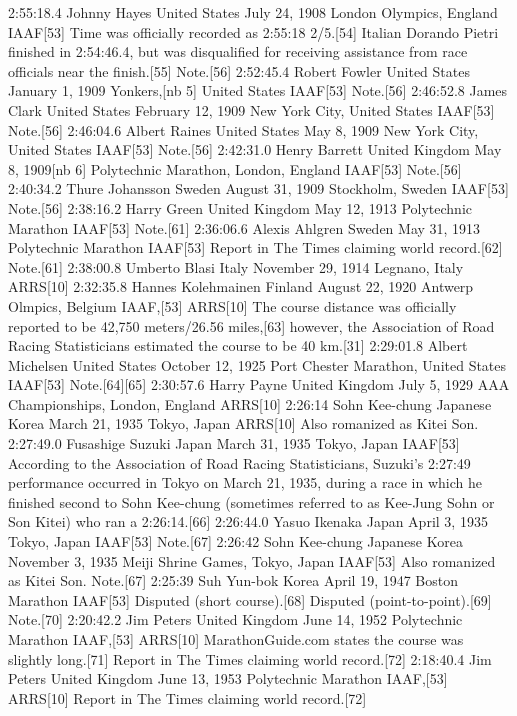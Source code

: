 2:55:18.4	Johnny Hayes	 United States	July 24, 1908	London Olympics, England	IAAF[53]	Time was officially recorded as 2:55:18 2/5.[54] Italian Dorando Pietri finished in 2:54:46.4, but was disqualified for receiving assistance from race officials near the finish.[55] Note.[56]
2:52:45.4	Robert Fowler	 United States	January 1, 1909	Yonkers,[nb 5] United States	IAAF[53]	Note.[56]
2:46:52.8	James Clark	 United States	February 12, 1909	New York City, United States	IAAF[53]	Note.[56]
2:46:04.6	Albert Raines	 United States	May 8, 1909	New York City, United States	IAAF[53]	Note.[56]
2:42:31.0	Henry Barrett	 United Kingdom	May 8, 1909[nb 6]	Polytechnic Marathon, London, England	IAAF[53]	Note.[56]
2:40:34.2	Thure Johansson	 Sweden	August 31, 1909	Stockholm, Sweden	IAAF[53]	Note.[56]
2:38:16.2	Harry Green	 United Kingdom	May 12, 1913	Polytechnic Marathon	IAAF[53]	Note.[61]
2:36:06.6	Alexis Ahlgren	 Sweden	May 31, 1913	Polytechnic Marathon	IAAF[53]	Report in The Times claiming world record.[62] Note.[61]
2:38:00.8	Umberto Blasi	 Italy	November 29, 1914	Legnano, Italy	ARRS[10]	
2:32:35.8	Hannes Kolehmainen	 Finland	August 22, 1920	Antwerp Olmpics, Belgium	IAAF,[53] ARRS[10]	The course distance was officially reported to be 42,750 meters/26.56 miles,[63] however, the Association of Road Racing Statisticians estimated the course to be 40 km.[31]
2:29:01.8	Albert Michelsen	 United States	October 12, 1925	Port Chester Marathon, United States	IAAF[53]	Note.[64][65]
2:30:57.6	Harry Payne	 United Kingdom	July 5, 1929	AAA Championships, London, England	ARRS[10]	
2:26:14	Sohn Kee-chung	Japanese Korea	March 21, 1935	Tokyo, Japan	ARRS[10]	Also romanized as Kitei Son.
2:27:49.0	Fusashige Suzuki	 Japan	March 31, 1935	Tokyo, Japan	IAAF[53]	According to the Association of Road Racing Statisticians, Suzuki's 2:27:49 performance occurred in Tokyo on March 21, 1935, during a race in which he finished second to Sohn Kee-chung (sometimes referred to as Kee-Jung Sohn or Son Kitei) who ran a 2:26:14.[66]
2:26:44.0	Yasuo Ikenaka	 Japan	April 3, 1935	Tokyo, Japan	IAAF[53]	Note.[67]
2:26:42	Sohn Kee-chung	Japanese Korea	November 3, 1935	Meiji Shrine Games, Tokyo, Japan	IAAF[53]	Also romanized as Kitei Son. Note.[67]
2:25:39	Suh Yun-bok	 Korea	April 19, 1947	Boston Marathon	IAAF[53]	Disputed (short course).[68] Disputed (point-to-point).[69] Note.[70]
2:20:42.2	Jim Peters	 United Kingdom	June 14, 1952	Polytechnic Marathon	IAAF,[53] ARRS[10]	MarathonGuide.com states the course was slightly long.[71] Report in The Times claiming world record.[72]
2:18:40.4	Jim Peters	 United Kingdom	June 13, 1953	Polytechnic Marathon	IAAF,[53] ARRS[10]	Report in The Times claiming world record.[72]
